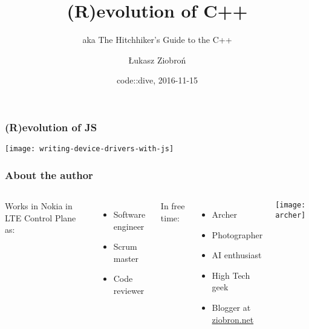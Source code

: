 \author{Łukasz Ziobroń}
\title[Crisis]{(R)evolution of C++}
\date{code::dive, 2016-11-15}
\subject{Computer Science}
\subtitle{aka The Hitchhiker's Guide to the C++}

\begin{frame}
\titlepage
\end{frame}

\begin{frame}
  \frametitle{(R)evolution of JS}
  \centering 
  \texttt{[image: writing-device-drivers-with-js]}
\end{frame}



\begin{frame}
    \frametitle{About the author}
    \begin{columns}
        Works in Nokia in LTE Control Plane as:
        \begin{itemize}
            \item Software engineer
            \item Scrum master
            \item Code reviewer
        \end{itemize}
        In free time:
        \begin{itemize}
            \item Archer
            \item Photographer
            \item AI enthusiast
            \item High Tech geek
            \item Blogger at \url{ziobron.net}
        \end{itemize}
        \texttt{[image: archer]}
    \end{columns}
\end{frame}


